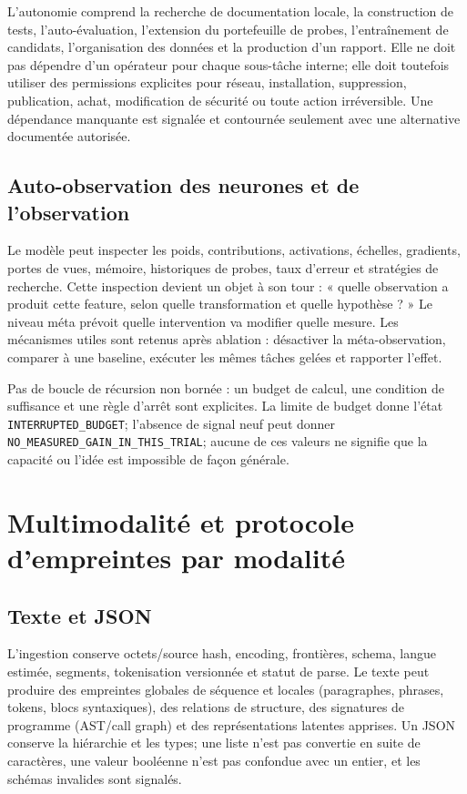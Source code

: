 \documentclass[11pt,a4paper]{report}
\begin{document}
L'autonomie comprend la recherche de documentation locale, la construction de tests, l'auto-évaluation, l'extension du portefeuille de probes, l'entraînement de candidats, l'organisation des données et la production d'un rapport. Elle ne doit pas dépendre d'un opérateur pour chaque sous-tâche interne; elle doit toutefois utiliser des permissions explicites pour réseau, installation, suppression, publication, achat, modification de sécurité ou toute action irréversible. Une dépendance manquante est signalée et contournée seulement avec une alternative documentée autorisée.

\section{Auto-observation des neurones et de l'observation}
Le modèle peut inspecter les poids, contributions, activations, échelles, gradients, portes de vues, mémoire, historiques de probes, taux d'erreur et stratégies de recherche. Cette inspection devient un objet à son tour : « quelle observation a produit cette feature, selon quelle transformation et quelle hypothèse ? » Le niveau méta prévoit quelle intervention va modifier quelle mesure. Les mécanismes utiles sont retenus après ablation : désactiver la méta-observation, comparer à une baseline, exécuter les mêmes tâches gelées et rapporter l'effet.

Pas de boucle de récursion non bornée : un budget de calcul, une condition de suffisance et une règle d'arrêt sont explicites. La limite de budget donne l'état \texttt{INTERRUPTED\_BUDGET}; l'absence de signal neuf peut donner \texttt{NO\_MEASURED\_GAIN\_IN\_THIS\_TRIAL}; aucune de ces valeurs ne signifie que la capacité ou l'idée est impossible de façon générale.

\chapter{Multimodalité et protocole d'empreintes par modalité}
\section{Texte et JSON}
L'ingestion conserve octets/source hash, encoding, frontières, schema, langue estimée, segments, tokenisation versionnée et statut de parse. Le texte peut produire des empreintes globales de séquence et locales (paragraphes, phrases, tokens, blocs syntaxiques), des relations de structure, des signatures de programme (AST/call graph) et des représentations latentes apprises. Un JSON conserve la hiérarchie et les types; une liste n'est pas convertie en suite de caractères, une valeur booléenne n'est pas confondue avec un entier, et les schémas invalides sont signalés.
\end{document}
